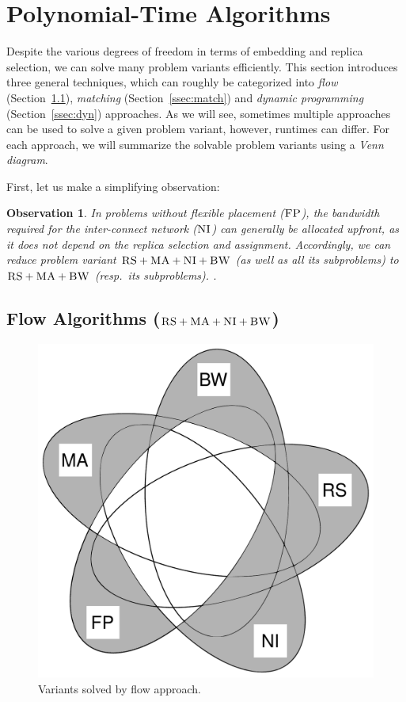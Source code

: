\documentclass[9pt]{sigcomm-alternate}
\newcommand{\CC}{\textsc{NI}}
\newcommand{\FP}{\textsc{FP}}
\newcommand{\RS}{\textsc{RS}}
\newcommand{\BW}{\textsc{BW}}
\newcommand{\MA}{\textsc{MA}}
\newtheorem{obs}{Observation}
\begin{document}
\section{Polynomial-Time Algorithms}\label{sec:poly}


Despite the various degrees of freedom in terms of embedding and replica selection,
we can solve many problem variants efficiently.
 This section introduces three general techniques,
 which can roughly be categorized into
 \emph{flow} (Section~\ref{ssec:flow}), \emph{matching} (Section~\ref{ssec:match}) and \emph{dynamic programming}
 (Section~\ref{ssec:dyn}) approaches.
 As we will see, sometimes multiple approaches can be used to solve a given problem variant, however,
 runtimes can differ.
For each approach, we will summarize the solvable problem variants using a \emph{Venn diagram}.

First, let us make a simplifying observation:
\begin{obs}\label{obs:nofp}
In problems without flexible placement ($\FP$),
the bandwidth required
for the inter-connect network ($\CC$) can generally be allocated \emph{upfront}, as it
does not depend on the replica
selection and assignment.
Accordingly, we can reduce problem variant $\RS+\MA+\CC +\BW$ (as well as all its subproblems)
to $\RS+\MA+\BW$ (resp.~its subproblems).
.
\end{obs}

\subsection{Flow Algorithms ($\RS+\MA+\CC+\BW$)}\label{ssec:flow}

\begin{figure}
\includegraphics[width=0.48\columnwidth]{figs/venn_flow.pdf}
\caption{Variants solved by flow approach.}
\label{fig:venn_flow}
\end{figure}
\end{document}
